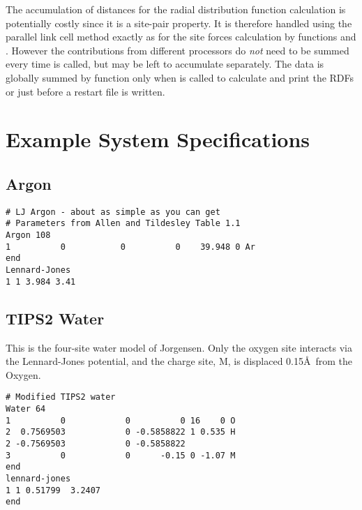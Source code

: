 \documentclass[a4paper,twoside]{report}
\begin{document}
The accumulation of distances for the radial distribution function
calculation is potentially costly since it is a site-pair property. It
is therefore handled using the parallel link cell method exactly as
for the site forces calculation by functions  and
.  However the contributions from different
processors do \emph{not} need to be summed every time
 is called, but may be left to accumulate
separately.  The data is globally summed by function
 only when  is called to
calculate and print the RDFs or just before a restart file is written.

\appendix
\chapter{Example System Specifications}  %
\label{sec:examples}
\section{Argon}%
\begin{verbatim}
# LJ Argon - about as simple as you can get
# Parameters from Allen and Tildesley Table 1.1
Argon 108
1          0           0          0    39.948 0 Ar
end
Lennard-Jones
1 1 3.984 3.41
\end{verbatim}
\section{TIPS2 Water}%
This is the four-site water model of Jorgensen\cite{jorgensen:82}.  
Only the oxygen site interacts via the Lennard-Jones
potential, and the charge site, M, is displaced 0.15\AA\ from the Oxygen.
\begin{verbatim}
# Modified TIPS2 water
Water 64
1          0            0          0 16    0 O
2  0.7569503            0 -0.5858822 1 0.535 H
2 -0.7569503            0 -0.5858822
3          0            0      -0.15 0 -1.07 M
end
lennard-jones
1 1 0.51799  3.2407
end
\end{verbatim}
\end{document}
